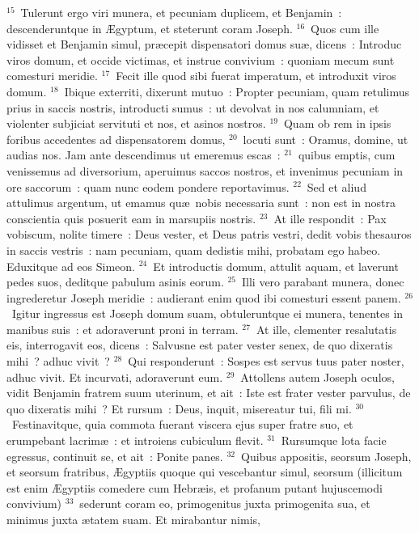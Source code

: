 ${}^{15}$~Tulerunt ergo viri munera, et pecuniam duplicem, et Benjamin~: descenderuntque in \AE gyptum, et steterunt coram Joseph.
${}^{16}$~Quos cum ille vidisset et Benjamin simul, pr\ae cepit dispensatori domus su\ae , dicens~: Introduc viros domum, et occide victimas, et instrue convivium~: quoniam mecum sunt comesturi meridie.
${}^{17}$~Fecit ille quod sibi fuerat imperatum, et introduxit viros domum.
${}^{18}$~Ibique exterriti, dixerunt mutuo~: Propter pecuniam, quam retulimus prius in saccis nostris, introducti sumus~: ut devolvat in nos calumniam, et violenter subjiciat servituti et nos, et asinos nostros.
${}^{19}$~Quam ob rem in ipsis foribus accedentes ad dispensatorem domus,
${}^{20}$~locuti sunt~: Oramus, domine, ut audias nos. Jam ante descendimus ut emeremus escas~:
${}^{21}$~quibus emptis, cum venissemus ad diversorium, aperuimus saccos nostros, et invenimus pecuniam in ore saccorum~: quam nunc eodem pondere reportavimus.
${}^{22}$~Sed et aliud attulimus argentum, ut emamus qu\ae\ nobis necessaria sunt~: non est in nostra conscientia quis posuerit eam in marsupiis nostris.
${}^{23}$~At ille respondit~: Pax vobiscum, nolite timere~: Deus vester, et Deus patris vestri, dedit vobis thesauros in saccis vestris~: nam pecuniam, quam dedistis mihi, probatam ego habeo. Eduxitque ad eos Simeon.
${}^{24}$~Et introductis domum, attulit aquam, et laverunt pedes suos, deditque pabulum asinis eorum.
${}^{25}$~Illi vero parabant munera, donec ingrederetur Joseph meridie~: audierant enim quod ibi comesturi essent panem.
${}^{26}$~Igitur ingressus est Joseph domum suam, obtuleruntque ei munera, tenentes in manibus suis~: et adoraverunt proni in terram.
${}^{27}$~At ille, clementer resalutatis eis, interrogavit eos, dicens~: Salvusne est pater vester senex, de quo dixeratis mihi~? adhuc vivit~?
${}^{28}$~Qui responderunt~: Sospes est servus tuus pater noster, adhuc vivit. Et incurvati, adoraverunt eum.
${}^{29}$~Attollens autem Joseph oculos, vidit Benjamin fratrem suum uterinum, et ait~: Iste est frater vester parvulus, de quo dixeratis mihi~? Et rursum~: Deus, inquit, misereatur tui, fili mi.
${}^{30}$~Festinavitque, quia commota fuerant viscera ejus super fratre suo, et erumpebant lacrim\ae~: et introiens cubiculum flevit.
${}^{31}$~Rursumque lota facie egressus, continuit se, et ait~: Ponite panes.
${}^{32}$~Quibus appositis, seorsum Joseph, et seorsum fratribus, \AE gyptiis quoque qui vescebantur simul, seorsum (illicitum est enim \AE gyptiis comedere cum Hebr\ae is, et profanum putant hujuscemodi convivium)
${}^{33}$~sederunt coram eo, primogenitus juxta primogenita sua, et minimus juxta \ae tatem suam. Et mirabantur nimis,
